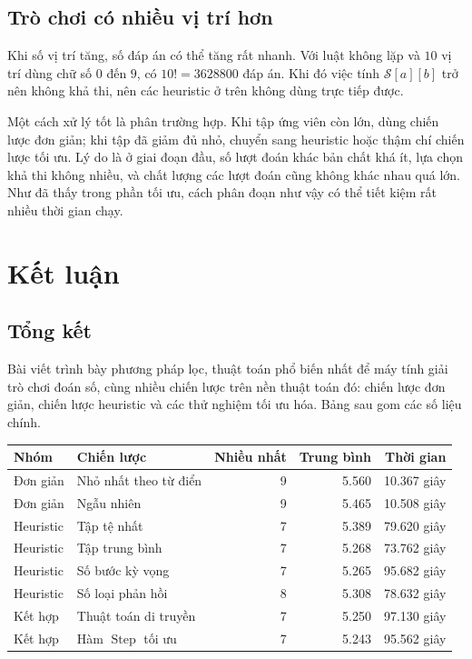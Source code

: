 \documentclass[11pt]{article}
\newcommand{\SetS}{\mathcal{S}}
\begin{document}
\subsection{Trò chơi có nhiều vị trí hơn}

Khi số vị trí tăng, số đáp án có thể tăng rất nhanh. Với luật không lặp và
\(10\) vị trí dùng chữ số \(0\) đến \(9\), có \(10! = 3628800\) đáp án.
Khi đó việc tính \(\SetS[a][b]\) trở nên không khả thi, nên các heuristic ở
trên không dùng trực tiếp được.

Một cách xử lý tốt là phân trường hợp. Khi tập ứng viên còn lớn, dùng chiến
lược đơn giản; khi tập đã giảm đủ nhỏ, chuyển sang heuristic hoặc thậm chí
chiến lược tối ưu. Lý do là ở giai đoạn đầu, số lượt đoán khác bản chất khá
ít, lựa chọn khả thi không nhiều, và chất lượng các lượt đoán cũng không khác
nhau quá lớn. Như đã thấy trong phần tối ưu, cách phân đoạn như vậy có thể
tiết kiệm rất nhiều thời gian chạy.

\section{Kết luận}

\subsection{Tổng kết}

Bài viết trình bày phương pháp lọc, thuật toán phổ biến nhất để máy tính giải
trò chơi đoán số, cùng nhiều chiến lược trên nền thuật toán đó: chiến lược đơn
giản, chiến lược heuristic và các thử nghiệm tối ưu hóa. Bảng sau gom các số
liệu chính.

\begin{center}
\small
\begin{tabular}{|l|l|r|r|r|}
\hline
Nhóm & Chiến lược & Nhiều nhất & Trung bình & Thời gian \\
\hline
Đơn giản & Nhỏ nhất theo từ điển & 9 & 5.560 & 10.367 giây \\
Đơn giản & Ngẫu nhiên & 9 & 5.465 & 10.508 giây \\
\hline
Heuristic & Tập tệ nhất & 7 & 5.389 & 79.620 giây \\
Heuristic & Tập trung bình & 7 & 5.268 & 73.762 giây \\
Heuristic & Số bước kỳ vọng & 7 & 5.265 & 95.682 giây \\
Heuristic & Số loại phản hồi & 8 & 5.308 & 78.632 giây \\
\hline
Kết hợp & Thuật toán di truyền & 7 & 5.250 & 97.130 giây \\
Kết hợp & Hàm \(\operatorname{Step}\) tối ưu & 7 & 5.243 & 95.562 giây \\
\hline
\end{tabular}
\end{center}
\end{document}
